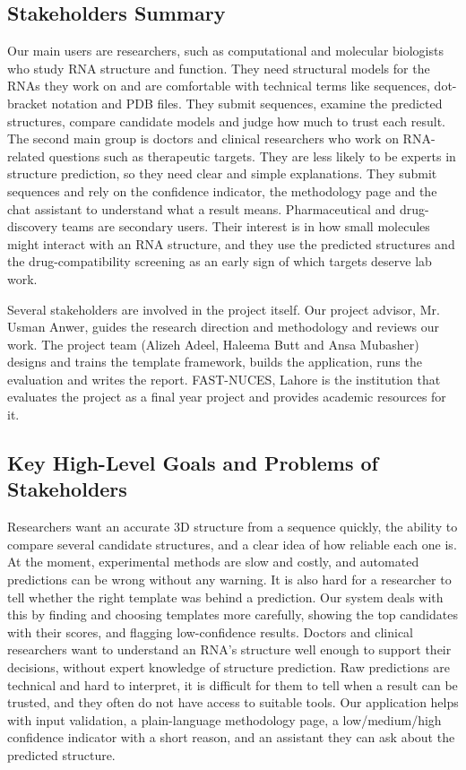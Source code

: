 \documentclass{FastFyp}
\begin{document}
\subsection{Stakeholders Summary}
Our main users are researchers, such as computational and molecular biologists who study RNA structure and function. They need structural models for the RNAs they work on and are comfortable with technical terms like sequences, dot-bracket notation and PDB files. They submit sequences, examine the predicted structures, compare candidate models and judge how much to trust each result. The second main group is doctors and clinical researchers who work on RNA-related questions such as therapeutic targets. They are less likely to be experts in structure prediction, so they need clear and simple explanations. They submit sequences and rely on the confidence indicator, the methodology page and the chat assistant to understand what a result means. Pharmaceutical and drug-discovery teams are secondary users. Their interest is in how small molecules might interact with an RNA structure, and they use the predicted structures and the drug-compatibility screening as an early sign of which targets deserve lab work.

Several stakeholders are involved in the project itself. Our project advisor, Mr. Usman Anwer, guides the research direction and methodology and reviews our work. The project team (Alizeh Adeel, Haleema Butt and Ansa Mubasher) designs and trains the template framework, builds the application, runs the evaluation and writes the report. FAST-NUCES, Lahore is the institution that evaluates the project as a final year project and provides academic resources for it.

\subsection{Key High-Level Goals and Problems of Stakeholders}
Researchers want an accurate 3D structure from a sequence quickly, the ability to compare several candidate structures, and a clear idea of how reliable each one is. At the moment, experimental methods are slow and costly, and automated predictions can be wrong without any warning. It is also hard for a researcher to tell whether the right template was behind a prediction. Our system deals with this by finding and choosing templates more carefully, showing the top candidates with their scores, and flagging low-confidence results. Doctors and clinical researchers want to understand an RNA's structure well enough to support their decisions, without expert knowledge of structure prediction. Raw predictions are technical and hard to interpret, it is difficult for them to tell when a result can be trusted, and they often do not have access to suitable tools. Our application helps with input validation, a plain-language methodology page, a low/medium/high confidence indicator with a short reason, and an assistant they can ask about the predicted structure.
\end{document}

